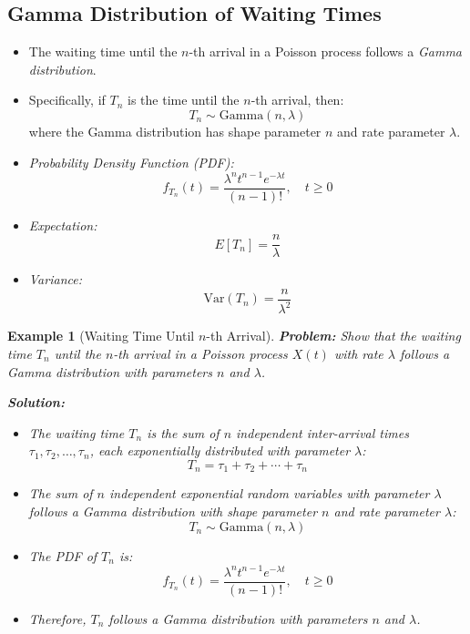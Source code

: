 \documentclass[12pt]{article}
\newtheorem{example}{Example}
\begin{document}
\subsection{Gamma Distribution of Waiting Times}
\begin{itemize}
    \item The waiting time until the \( n \)-th arrival in a Poisson process follows a \textit{Gamma distribution}.
    \item Specifically, if \( T_n \) is the time until the \( n \)-th arrival, then:
    \[
    T_n \sim \text{Gamma}(n, \lambda)
    \]
    where the Gamma distribution has shape parameter \( n \) and rate parameter \( \lambda \).
    \item \textit{Probability Density Function (PDF):}
    \[
    f_{T_n}(t) = \frac{\lambda^n t^{n-1} e^{-\lambda t}}{(n-1)!}, \quad t \geq 0
    \]
    \item \textit{Expectation:}
    \[
    E[T_n] = \frac{n}{\lambda}
    \]
    \item \textit{Variance:}
    \[
    \text{Var}(T_n) = \frac{n}{\lambda^2}
    \]
\end{itemize}

\begin{example}[Waiting Time Until \( n \)-th Arrival]
    \textbf{Problem:} Show that the waiting time \( T_n \) until the \( n \)-th arrival in a Poisson process \( X(t) \) with rate \( \lambda \) follows a Gamma distribution with parameters \( n \) and \( \lambda \).
    
    \textbf{Solution:}
    \begin{itemize}
        \item The waiting time \( T_n \) is the sum of \( n \) independent inter-arrival times \( \tau_1, \tau_2, \ldots, \tau_n \), each exponentially distributed with parameter \( \lambda \):
        \[
        T_n = \tau_1 + \tau_2 + \cdots + \tau_n
        \]
        \item The sum of \( n \) independent exponential random variables with parameter \( \lambda \) follows a Gamma distribution with shape parameter \( n \) and rate parameter \( \lambda \):
        \[
        T_n \sim \text{Gamma}(n, \lambda)
        \]
        \item The PDF of \( T_n \) is:
        \[
        f_{T_n}(t) = \frac{\lambda^n t^{n-1} e^{-\lambda t}}{(n-1)!}, \quad t \geq 0
        \]
        \item Therefore, \( T_n \) follows a Gamma distribution with parameters \( n \) and \( \lambda \).
    \end{itemize}
\end{example}
\end{document}
